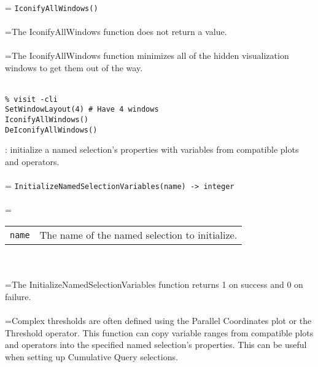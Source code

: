 \documentclass[10pt,a4paper]{report}
\begin{document}
 \\ 
\hangindent=\parindent 
\verb!IconifyAllWindows()!\\ [-3mm]

 \\ 
\hangindent=\parindent The IconifyAllWindows function does not return a value. \\[-3mm] 

 \\ 
\hangindent=\parindent The IconifyAllWindows function minimizes all of the hidden visualization windows to get them out of the way. \\[-3mm] 

\\[-6mm]
\begin{verbatim}% visit -cli
SetWindowLayout(4) # Have 4 windows
IconifyAllWindows()
DeIconifyAllWindows()
\end{verbatim}
\newpage


{}
: initialize a named selection's properties with variables from compatible plots and operators.\\[-3mm]

 \\ 
\hangindent=\parindent 
\verb!InitializeNamedSelectionVariables(name) -> integer!\\ [-3mm]

 \\ 
\hangindent=\parindent 
\begin{tabular}{lp{9cm}}
\verb!name! & The name of the named selection to initialize. \\
\end{tabular} \\[-2mm]


 \\ 
\hangindent=\parindent The InitializeNamedSelectionVariables function returns 1 on success and 0 on failure. \\[-3mm] 

 \\ 
\hangindent=\parindent Complex thresholds are often defined using the Parallel Coordinates plot or the Threshold operator. This function can copy variable ranges from compatible plots and operators into the specified named selection's properties. This can be useful when setting up Cumulative Query selections. \\[-3mm] 
\end{document}
